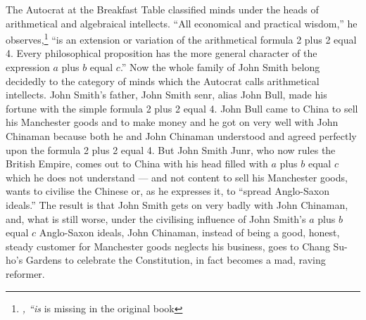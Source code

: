 The Autocrat at the Breakfast Table    classified minds under the heads of arithmetical and algebraical intellects.
``All economical and practical wisdom,'' he observes,\footnote{\emph{, ``is} is missing in the original book} ``is an extension or variation of the arithmetical formula 2 plus 2 equal 4. 
Every philosophical proposition has the more general character of the expression $a$ plus $b$ equal $c$.''
Now the whole family of John Smith belong decidedly to the category of minds which the Autocrat calls arithmetical intellects.
John Smith's father, John Smith senr, alias John Bull, made his fortune with the simple formula 2 plus 2 equal 4.
John Bull came to China to sell his Manchester goods and to make money and he got on very well with John Chinaman because both he and John Chinaman understood and agreed perfectly upon the formula 2 plus 2 equal 4.
But John Smith Junr, who now rules the British Empire, comes out to China with his head filled with $a$ plus $b$ equal $c$ which he does not understand --- and not content to sell his Manchester goods, wants to civilise the Chinese or, as he expresses it, to ``spread Anglo-Saxon ideals.''
The result is that John Smith gets on very badly with John Chinaman, and, what is still worse, under the civilising influence of John Smith's $a$ plus $b$ equal $c$ Anglo-Saxon ideals, John Chinaman, instead of being a good, honest, steady customer for Manchester goods neglects his business, goes to Chang Su-ho's Gardens  to celebrate the Constitution, in fact becomes a mad, raving reformer.

